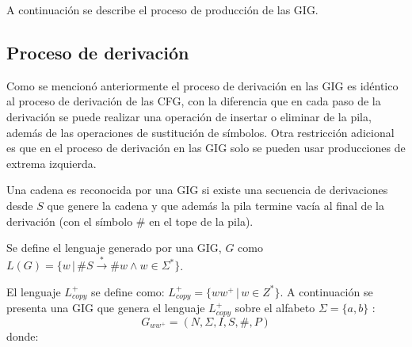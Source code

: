 A continuación se describe el proceso de producción de las GIG.

\subsection{Proceso de derivación}

Como se mencionó anteriormente el proceso de derivación en las GIG es idéntico al proceso de derivación de las CFG, con la diferencia que
en cada paso de la derivación se puede realizar una operación de insertar o eliminar de la pila, además de las operaciones de sustitución de símbolos.
Otra restricción adicional es que en el proceso de derivación en las GIG solo se pueden usar producciones de extrema izquierda.

Una cadena es reconocida por una GIG si existe una secuencia de derivaciones desde $S$ que genere la cadena y que además la pila
termine vacía al final de la derivación (con el símbolo $\#$ en el tope de la pila).

Se define el lenguaje generado por una GIG, $G$
como $L(G)=\{w\,|\,\#S\overset{*}{\to}\#w \wedge w\in \Sigma^* \}$.

El lenguaje $L_{copy}^+$ se define como: $L_{copy}^+=\{ww^+\,|\,w\in Z^*\}$. A continuación se presenta una GIG que genera el lenguaje $L_{copy}^+$ sobre el alfabeto $\Sigma=\{a,b\}$ \cite{globalIndexLanguages}:
$$
      G_{ww^+} = (N, \Sigma, I, S, \#, P)
$$
donde:

